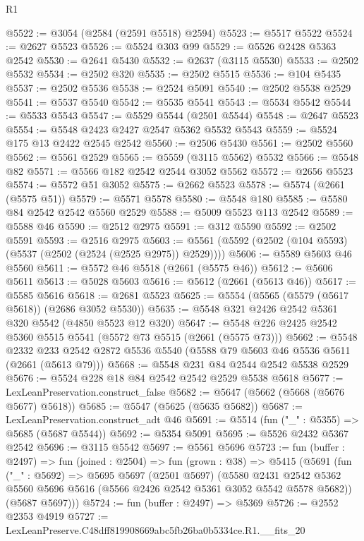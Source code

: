 \begin{lexlean}{R1}
\begin{coremodule}
@5522 := @3054 (@2584 (@2591 @5518) @2594)
@5523 := @5517 @5522
@5524 := @2627 @5523
@5526 := @5524 @303 @99
@5529 := @5526 @2428 @5363 @2542
@5530 := @2641 @5430
@5532 := @2637 (@3115 @5530)
@5533 := @2502 @5532
@5534 := @2502 @320
@5535 := @2502 @5515
@5536 := @104 @5435
@5537 := @2502 @5536
@5538 := @2524 @5091
@5540 := @2502 @5538 @2529
@5541 := @5537 @5540
@5542 := @5535 @5541
@5543 := @5534 @5542
@5544 := @5533 @5543
@5547 := @5529 @5544 (@2501 @5544)
@5548 := @2647 @5523
@5554 := @5548 @2423 @2427 @2547 @5362 @5532 @5543
@5559 := @5524 @175 @13 @2422 @2545 @2542
@5560 := @2506 @5430
@5561 := @2502 @5560
@5562 := @5561 @2529
@5565 := @5559 (@3115 @5562) @5532
@5566 := @5548 @82
@5571 := @5566 @182 @2542 @2544 @3052 @5562
@5572 := @2656 @5523
@5574 := @5572 @51 @3052
@5575 := @2662 @5523
@5578 := @5574 (@2661 (@5575 @51))
@5579 := @5571 @5578
@5580 := @5548 @180
@5585 := @5580 @84 @2542 @2542 @5560 @2529
@5588 := @5009 @5523 @113 @2542
@5589 := @5588 @46
@5590 := @2512 @2975
@5591 := @312 @5590
@5592 := @2502 @5591
@5593 := @2516 @2975
@5603 := @5561 (@5592 (@2502 (@104 @5593) (@5537 (@2502 (@2524 (@2525 @2975)) @2529))))
@5606 := @5589 @5603 @46 @5560
@5611 := @5572 @46 @5518 (@2661 (@5575 @46))
@5612 := @5606 @5611
@5613 := @5028 @5603
@5616 := @5612 (@2661 (@5613 @46))
@5617 := @5585 @5616
@5618 := @2681 @5523
@5625 := @5554 (@5565 (@5579 (@5617 @5618)) (@2686 @3052 @5530))
@5635 := @5548 @321 @2426 @2542 @5361 @320 @5542 (@4850 @5523 @12 @320)
@5647 := @5548 @226 @2425 @2542 @5360 @5515 @5541 (@5572 @73 @5515 (@2661 (@5575 @73)))
@5662 := @5548
    @2332
    @233
    @2542
    @2872
    @5536
    @5540
    (@5588 @79 @5603 @46 @5536 @5611 (@2661 (@5613 @79)))
@5668 := @5548 @231 @84 @2544 @2542 @5538 @2529
@5676 := @5524 @228 @18 @84 @2542 @2542 @2529 @5538 @5618
@5677 := LexLeanPreservation.construct_false
@5682 := @5647 (@5662 (@5668 (@5676 @5677) @5618))
@5685 := @5547 (@5625 (@5635 @5682))
@5687 := LexLeanPreservation.construct_adt @46
@5691 := @5514 (fun ("_" : @5355) => @5685 (@5687 @5544))
@5692 := @5354 @5091
@5695 := @5526 @2432 @5367 @2542
@5696 := @3115 @5542
@5697 := @5561 @5696
@5723 := fun (buffer : @2497) =>
  fun (joined : @2504) =>
  fun (grown : @38) =>
  @5415
    (@5691
      (fun ("_" : @5692) =>
      @5695
        @5697
        (@2501 @5697)
        (@5580
          @2431
          @2542
          @5362
          @5560
          @5696
          @5616
          (@5566 @2426 @2542 @5361 @3052 @5542 @5578 @5682))
        (@5687 @5697)))
@5724 := fun (buffer : @2497) => @5369
@5726 := @2552 @2353 @4919
@5727 := LexLeanPreserve.C48dff819908669abc5fb26ba0b5334ce.R1.__fits_20

\end{coremodule}
\end{lexlean}
